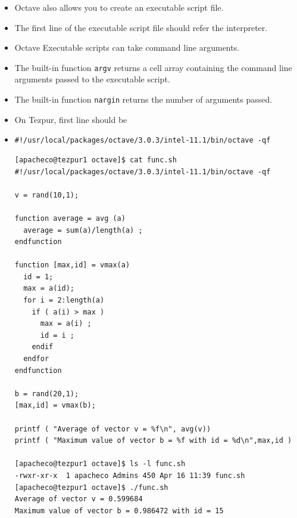 \documentclass[t,compress,xcolor=svgnames]{beamer}
\begin{document}
\begin{frame}
\begin{itemize}
{\begin{verbatim}
[apacheco@tezpur1 octave]$ octave -q
octave:1> source('func.txt')
Average of vector v = 0.487381
Maximum value of vector b = 0.878363 with id = 14
      \end{verbatim}
    }
    \item Octave also allows you to create an executable script file.
    \item The first line of the executable script file should refer the interpreter.
    \item Octave Executable scripts can take command line arguments.
    \item The built-in function \texttt{argv} returns a cell array containing the command line arguments passed to the executable script.
    \item The built-in function \texttt{nargin} returns the number of arguments passed.
    \item On Tezpur, first line should be
    \item[]{\tiny\texttt{\#!/usr/local/packages/octave/3.0.3/intel-11.1/bin/octave -qf}}
    {\tiny
      \begin{verbatim}
[apacheco@tezpur1 octave]$ cat func.sh 
#!/usr/local/packages/octave/3.0.3/intel-11.1/bin/octave -qf

v = rand(10,1);

function average = avg (a)
  average = sum(a)/length(a) ;
endfunction

function [max,id] = vmax(a)
  id = 1;
  max = a(id);
  for i = 2:length(a)
    if ( a(i) > max )
      max = a(i) ;
      id = i ;
    endif
  endfor
endfunction

b = rand(20,1);
[max,id] = vmax(b); 

printf ( "Average of vector v = %f\n", avg(v)) 
printf ( "Maximum value of vector b = %f with id = %d\n",max,id )

[apacheco@tezpur1 octave]$ ls -l func.sh 
-rwxr-xr-x  1 apacheco Admins 450 Apr 16 11:39 func.sh
[apacheco@tezpur1 octave]$ ./func.sh 
Average of vector v = 0.599684
Maximum value of vector b = 0.986472 with id = 15
      \end{verbatim}
    }
  \end{itemize}
\end{frame}
\end{document}
